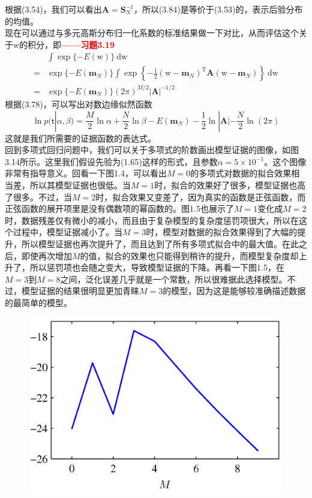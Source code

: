 \documentclass[b5paper]{book}
\numberwithin{equation}{chapter}
\newcommand {\bw} {\boldsymbol{\mathrm{w}}}
\newcommand {\sft} {\boldsymbol{\mathsf{t}}}
\newcommand {\rmT} {\mathrm{T}}
\newcommand {\rmd} {\mathrm{d}}
\begin{document}
{\begin{equation}
	\end{equation}
	根据(3.54)，我们可以看出$\mathbf{A} = \mathbf{S}_N^{-1}$，所以(3.84)是等价于(3.53)的，表示后验分布的均值。\\
	\indent 现在可以通过与多元高斯分布归一化系数的标准结果做一下对比，从而评估这个关于$\bw$的积分，即\textcolor{red}{\textbf{——习题3.19}}
	\begin{equation}
	\begin{split}
		&\int \exp\{-E(\bw)\}\ \rmd \bw \\
		= &\exp\{-E(\mathbf{m}_N)\}\int \exp\left\{-\frac{1}{2}(\bw - \mathbf{m}_N)^{\rmT}\mathbf{A}(\bw - \mathbf{m}_N)\right\}\ \rmd \bw \\
		= &\exp\{-E(\mathbf{m}_N)\}(2\pi)^{M/2}|\mathbf{A}|^{-1/2}
	\end{split}
	\end{equation}
	根据(3.78)，可以写出对数边缘似然函数
	\begin{equation}
		\ln p(\sft|\alpha,\beta) =\frac{M}{2}\ln \alpha + \frac{N}{2} \ln \beta - E(\mathbf{m}_N) -\frac{1}{2}\ln |\mathbf{A}| - \frac{N}{2}\ln (2\pi)
	\end{equation}
	这就是我们所需要的证据函数的表达式。\\
	\indent 回到多项式回归问题中，我们可以关于多项式的阶数画出模型证据的图像，如图3.14所示。这里我们假设先验为(1.65)这样的形式，且参数$\alpha = 5 \times 10^{-1}$。这个图像非常有指导意义。回看一下图1.4，可以看出$M=0$的多项式对数据的拟合效果相当差，所以其模型证据也很低。当$M=1$时，拟合的效果好了很多，模型证据也高了很多。不过，当$M=2$时，拟合效果又变差了，因为真实的函数是正弦函数，而正弦函数的展开项里是没有偶数项的幂函数的。图1.5也展示了$M=1$变化成$M=2$时，数据残差仅有微小的减小，而且由于复杂模型的复杂度惩罚项很大，所以在这个过程中，模型证据减小了。当$M=3$时，模型对数据的拟合效果得到了大幅的提升，所以模型证据也再次提升了，而且达到了所有多项式拟合中的最大值。在此之后，即使再次增加$M$的值，拟合的效果也只能得到稍许的提升，而模型复杂度却上升了，所以惩罚项也会随之变大，导致模型证据的下降。再看一下图1.5，在$M=3$到$M=8$之间，泛化误差几乎就是一个常数，所以很难据此选择模型。不过，模型证据的结果很明显更加青睐$M=3$的模型，因为这是能够较准确描述数据的最简单的模型。
	\begin{figure}[ht]
		\centering
		\includegraphics[scale=0.8]{Images/3-14.png}

\end{figure}}
\end{document}
